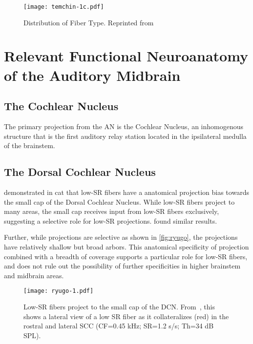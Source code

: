 \begin{figure}[htbp]
	\centering
	\texttt{[image: temchin-1c.pdf]}
	\caption[Distribution of Fiber Type]{Distribution of Fiber Type.  Reprinted from \cite{Temchin2008Threshold}}
	\label{fig:temchin-1}
\end{figure}

\section{Relevant Functional Neuroanatomy of the Auditory Midbrain} %
\label{sec:relevant_functional_neuroanatomy_of_the_auditory_midbrain}
\subsection{The Cochlear Nucleus} %
\label{sub:the_cochlear_nucleus}
The primary projection from the AN is the Cochlear Nucleus, an inhomogenous structure that is the first auditory relay station located in the ipsilateral medulla of the brainstem.  
\subsection{The Dorsal Cochlear Nucleus} %
\label{sub:the_dorsal_cochlear_nucleus}
\cite{Ryugo2008Projections} demonstrated in cat that low-SR fibers have a anatomical projection bias towards the small cap of the Dorsal Cochlear Nucleus.  While low-SR fibers project to many areas, the small cap receives input from low-SR fibers exclusively, suggesting a selective role for low-SR projections. \cite{Liberman1993Central} found similar results. 

Further, while projections are selective as shown in \autoref{fig:ryugo}, the projections have relatively shallow but broad arbors. This anatomical specificity of projection combined with a breadth of coverage supports a particular role for low-SR fibers, and does not rule out the possibility of further specificities in higher brainstem and midbrain areas. 

\begin{figure}[htbp]
	\centering
	\texttt{[image: ryugo-1.pdf]}
	\caption[Low SR Fibers Project to the Small Cap]{Low-SR fibers project to the small cap of the DCN.  From~\cite{Ryugo2008Projections}, this shows a lateral view of a low SR fiber as it collateralizes (red) in the rostral and lateral SCC (CF=0.45 kHz; SR=1.2 s/s; Th=34 dB SPL).}
	\label{fig:ryugo}
\end{figure}

